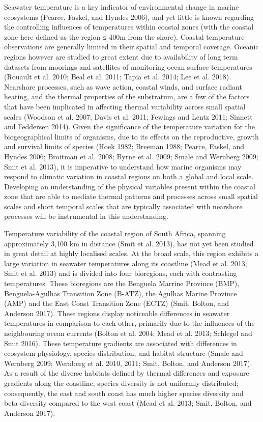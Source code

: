 \documentclass[12pt,a4paper,]{article}
\begin{document}
Seawater temperature is a key indicator of environmental change in
marine ecosystems (Pearce, Faskel, and Hyndes 2006), and yet little is
known regarding the controlling influences of temperatures within
coastal zones (with the coastal zone here defined as the region ≤ 400m
from the shore). Coastal temperature observations are generally limited
in their spatial and temporal coverage. Oceanic regions however are
studied to great extent due to availability of long term datasets from
moorings and satellites of monitoring ocean surface temperatures
(Rouault et al. 2010; Beal et al. 2011; Tapia et al. 2014; Lee et al.
2018). Nearshore processes, such as wave action, coastal winds, and
surface radiant heating, and the thermal properties of the substratum,
are a few of the factors that have been implicated in affecting thermal
variability across small spatial scales (Woodson et al. 2007; Davis et
al. 2011; Fewings and Lentz 2011; Sinnett and Feddersen 2014). Given the
significance of the temperature variation for the biogeographical limits
of organisms, due to its effects on the reproductive, growth and
survival limits of species (Hoek 1982; Breeman 1988; Pearce, Faskel, and
Hyndes 2006; Broitman et al. 2008; Byrne et al. 2009; Smale and Wernberg
2009; Smit et al. 2013), it is imperative to understand how marine
organisms may respond to climatic variation in coastal regions on both a
global and local scale. Developing an understanding of the physical
variables present within the coastal zone that are able to mediate
thermal patterns and processes across small spatial scales and short
temporal scales that are typically associated with nearshore processes
will be instrumental in this understanding.

Temperature variability of the coastal region of South Africa, spanning
approximately 3,100 km in distance (Smit et al. 2013), has not yet been
studied in great detail at highly localised scales. At the broad scale,
this region exhibits a large variation in seawater temperatures along
its coastline (Mead et al. 2013; Smit et al. 2013) and is divided into
four bioregions, each with contrasting temperatures. These bioregions
are the Benguela Marrine Province (BMP), Benguela-Agulhas Transition
Zone (B-ATZ), the Agulhas Marine Province (AMP) and the East Coast
Transition Zone (ECTZ) (Smit, Bolton, and Anderson 2017). These regions
display noticeable differences in seawater temperatures in comparison to
each other, primarily due to the influences of the neighbouring ocean
currents (Bolton et al. 2004; Mead et al. 2013; Schlegel and Smit 2016).
These temperature gradients are associated with differences in ecosystem
physiology, species distribution, and habitat structure (Smale and
Wernberg 2009; Wernberg et al. 2010, 2011; Smit, Bolton, and Anderson
2017). As a result of the diverse habitats defined by thermal
differences and exposure gradients along the coastline, species
diversity is not uniformly distributed; consequently, the east and south
coast has much higher species diversity and beta-diversity compared to
the west coast (Mead et al. 2013; Smit, Bolton, and Anderson 2017).
\end{document}
